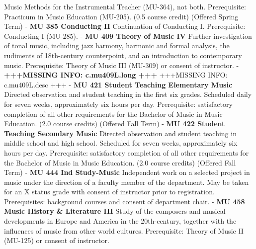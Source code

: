 \documentclass[
  letterpaper,
]{scrbook}
\begin{document}
Music Methods for the Instrumental Teacher (MU-364), not both.
Prerequisite: Practicum in Music Education (MU-205). (0.5 course credit)
(Offered Spring Term) - \textbf{MU 385 Conducting II} Continuation of
Conducting I. Prerequisite: Conducting I (MU-285). - \textbf{MU 409
Theory of Music IV} Further investigation of tonal music, including jazz
harmony, harmonic and formal analysis, the rudiments of 18th-century
counterpoint, and an introduction to contemporary music. Prerequisite:
Theory of Music III (MU-309) or consent of instructor. -
\textbf{+++MISSING INFO: c.mu409L.long +++} +++MISSING INFO:
c.mu409L.desc +++ - \textbf{MU 421 Student Teaching Elementary Music}
Directed observation and student teaching in the first six grades.
Scheduled daily for seven weeks, approximately six hours per day.
Prerequisite: satisfactory completion of all other requirements for the
Bachelor of Music in Music Education. (2.0 course credits) (Offered Fall
Term) - \textbf{MU 422 Student Teaching Secondary Music} Directed
observation and student teaching in middle school and high school.
Scheduled for seven weeks, approximately six hours per day.
Prerequisite: satisfactory completion of all other requirements for the
Bachelor of Music in Music Education. (2.0 course credits) (Offered Fall
Term) - \textbf{MU 444 Ind Study-Music} Independent work on a selected
project in music under the direction of a faculty member of the
department. May be taken for an X status grade with consent of
instructor prior to registration. Prerequisites: background courses and
consent of department chair. - \textbf{MU 458 Music History \&
Literature III} Study of the composers and musical developments in
Europe and America in the 20th-century, together with the influences of
music from other world cultures. Prerequisite: Theory of Music II
(MU-125) or consent of instructor.
\end{document}
